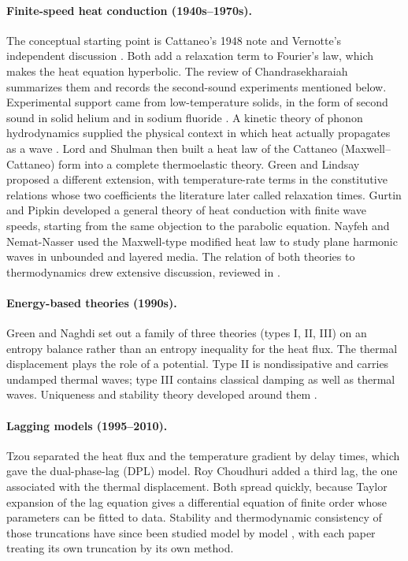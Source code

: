 \paragraph{Finite-speed heat conduction (1940s--1970s).} The conceptual starting point is Cattaneo's 1948 note \citep{Cattaneo1948} and Vernotte's independent discussion \citep{Vernotte1958}. Both add a relaxation term to Fourier's law, which makes the heat equation hyperbolic. The review of Chandrasekharaiah \citep{Chandrasekharaiah1986} summarizes them and records the second-sound experiments mentioned below. Experimental support came from low-temperature solids, in the form of second sound in solid helium and in sodium fluoride \citep{Ackerman1966,Jackson1970}. A kinetic theory of phonon hydrodynamics supplied the physical context in which heat actually propagates as a wave \citep{GuyerKrumhansl1966,GuyerKrumhansl1966II,Chester1963}. Lord and Shulman \citep{Lord1967} then built a heat law of the Cattaneo (Maxwell--Cattaneo) form into a complete thermoelastic theory. Green and Lindsay \citep{Green1972} proposed a different extension, with temperature-rate terms in the constitutive relations whose two coefficients the literature later called relaxation times. Gurtin and Pipkin \citep{GurtinPipkin1968} developed a general theory of heat conduction with finite wave speeds, starting from the same objection to the parabolic equation. Nayfeh and Nemat-Nasser \citep{NayfehNematNasser1971} used the Maxwell-type modified heat law to study plane harmonic waves in unbounded and layered media. The relation of both theories to thermodynamics drew extensive discussion, reviewed in \citep{Chandrasekharaiah1986,Joseph1989,Joseph1990}.

\paragraph{Energy-based theories (1990s).} Green and Naghdi \citep{Green1991,GreenGN1992,Green1993} set out a family of three theories (types I, II, III) on an entropy balance rather than an entropy inequality for the heat flux. The thermal displacement plays the role of a potential. Type II is nondissipative and carries undamped thermal waves; type III contains classical damping as well as thermal waves. Uniqueness and stability theory developed around them \citep{Chandrasekharaiah1996}.

\paragraph{Lagging models (1995--2010).} Tzou \citep{Tzou1995,Tzou1997} separated the heat flux and the temperature gradient by delay times, which gave the dual-phase-lag (DPL) model. Roy Choudhuri \citep{RoyChoudhuri2007} added a third lag, the one associated with the thermal displacement. Both spread quickly, because Taylor expansion of the lag equation gives a differential equation of finite order whose parameters can be fitted to data. Stability and thermodynamic consistency of those truncations have since been studied model by model \citep{Quintanilla2003DPL,Chirita2016,Tibullo2017,vanDerMerwe2021}, with each paper treating its own truncation by its own method.

